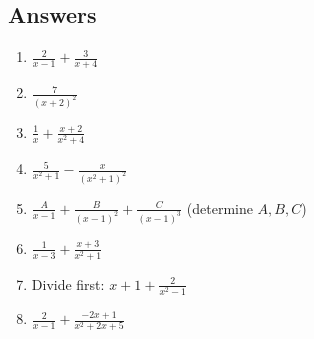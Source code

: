 \subsection*{Answers}

\begin{enumerate}[label=\arabic*.]
	\item $\displaystyle \frac{2}{x-1}+\frac{3}{x+4}$
	\item $\displaystyle \frac{7}{(x+2)^2}$
	\item $\displaystyle \frac{1}{x}+\frac{x+2}{x^2+4}$
	\item $\displaystyle \frac{5}{x^2+1}-\frac{x}{(x^2+1)^2}$
	\item $\displaystyle \frac{A}{x-1}+\frac{B}{(x-1)^2}+\frac{C}{(x-1)^3}$ (determine $A, B, C$)
	\item $\displaystyle \frac{1}{x-3}+\frac{x+3}{x^2+1}$
	\item Divide first: $x+1+\frac{2}{x^2-1}$
	\item $\displaystyle \frac{2}{x-1}+\frac{-2x+1}{x^2+2x+5}$
\end{enumerate}
%	
%	
%	
%	

